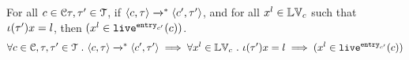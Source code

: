 %
\begin{lem}
\label{lem:inv_live}
For all $c \in \mathcal{C} \mathtt{\tau}, \mathtt{\tau}' \in \mathcal{T} $, if 
$\langle c, \mathtt{\tau} \rangle \xrightarrow{}^* \langle c', \mathtt{\tau}' \rangle$,
and for all $x^l \in \mathbb{LV}_c$ such that 
$\iota(\mathtt{\tau}') x = l $, then $(x^l \in \mathtt{live}^{\mathtt{entry}_{c'}}(c))$.
%
\[
	\forall c \in \mathcal{C} , \mathtt{\tau}, \mathtt{\tau}' \in \mathcal{T} ~.~
	\langle c, \mathtt{\tau} \rangle \xrightarrow{}^* \langle c', \mathtt{\tau}' \rangle
	\implies
	\forall x^l \in \mathbb{LV}_c ~.~ \iota(\mathtt{\tau}') x = l \implies (x^l \in \mathtt{live}^{\mathtt{entry}_{c'}}(c))
\]
\end{lem}
%
%
%
%
